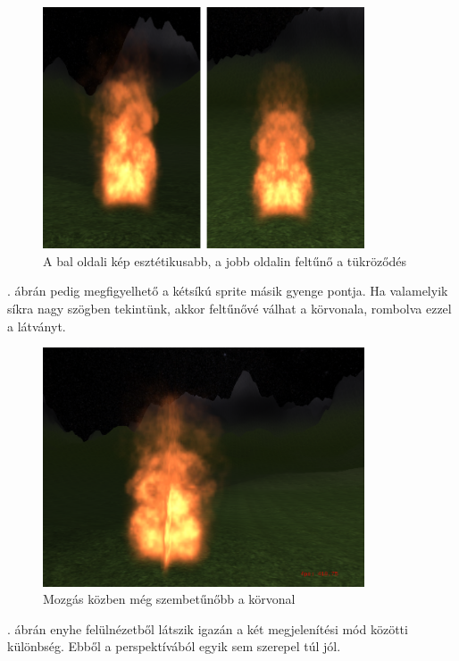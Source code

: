 \begin{figure}[h!]
 \centering
 \includegraphics[width=0.85\textwidth]{kepek/billboardFinal3.png}
 \caption{A bal oldali kép esztétikusabb, a jobb oldalin feltűnő a tükröződés}
 \label{fig:billboardFinal3}
\end{figure}

. ábrán pedig megfigyelhető a kétsíkú sprite másik gyenge pontja. Ha valamelyik síkra nagy szögben tekintünk, akkor feltűnővé válhat a körvonala, rombolva ezzel a látványt.

\begin{figure}[h!]
 \centering
 \includegraphics[width=0.85\textwidth]{kepek/billboardFinal4.png}
 \caption{Mozgás közben még szembetűnőbb a körvonal}
 \label{fig:billboardFinal4}
\end{figure}

. ábrán enyhe felülnézetből látszik igazán a két megjelenítési mód közötti különbség. Ebből a perspektívából egyik sem szerepel túl jól.

